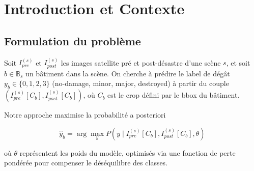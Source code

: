 
\section{Introduction et Contexte}

\subsection{Formulation du problème}

Soit $I_{pre}^{(s)}$ et $I_{post}^{(s)}$ les images satellite pré et post-désastre d'une scène $s$, 
et soit $b \in \mathbb{B}_s$ un bâtiment dans la scène. On cherche à prédire le label de dégât $y_b \in \{0,1,2,3\}$ 
(no-damage, minor, major, destroyed) à partir du couple $(I_{pre}^{(s)}[C_b], I_{post}^{(s)}[C_b])$, 
où $C_b$ est le crop défini par le bbox du bâtiment.

Notre approche maximise la probabilité a posteriori\:

$$\hat{y}_b = \arg\max_y P(y \mid I_{pre}^{(s)}[C_b], I_{post}^{(s)}[C_b], \theta)$$

où $\theta$ représentent les poids du modèle, optimisés via une fonction de perte pondérée 
pour compenser le déséquilibre des classes.

